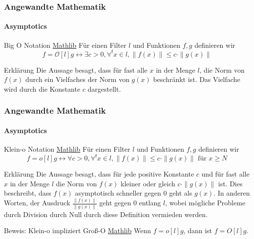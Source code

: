 \documentclass{beamer}
\begin{document}
\begin{frame}
    \frametitle{Angewandte Mathematik}
    \framesubtitle{Asymptotics}
    \begin{block}{Big O Notation \href{https://github.com/leanprover-community/mathlib4/blob/69d256b3c87085fec8063376dfb231ee1fd345d8/Mathlib/Analysis/Asymptotics/Asymptotics.lean\#L75-L80}{Mathlib}}
        Für einen Filter $l$ und Funktionen $f,g$ definieren wir 
        \[
       f = \mathcal{O}[l] g \leftrightarrow  \exists c > 0, \forall^\mathsf{f} x \in l, \|f(x)\| \leq c \cdot \|g(x)\|
        \]
    \end{block}

    \begin{block}{Erklärung}
        Die Aussage besagt, dass für fast alle \(x\) in der Menge \(l\), die Norm von \(f(x)\) durch ein Vielfaches der Norm von \(g(x)\) beschränkt ist. Das Vielfache wird durch die Konstante \(c\) dargestellt.
    \end{block}
    
\end{frame}

\begin{frame}
    \frametitle{Angewandte Mathematik}
    \framesubtitle{Asymptotics}

    \begin{block}{Klein-o Notation \href{https://github.com/leanprover-community/mathlib4/blob/69d256b3c87085fec8063376dfb231ee1fd345d8/Mathlib/Analysis/Asymptotics/Asymptotics.lean\#L161-L162}{Mathlib}}
        Für einen Filter $l$ und Funktionen $f,g$ definieren wir 
        \[
       f = o[l] g \leftrightarrow \forall c > 0,  \forall^\mathsf{f} x \in l, \|f(x)\| \leq c \cdot \|g(x)\| \text{ für } x \geq N
        \]
    \end{block}

    \begin{block}{Erklärung}
        Die Aussage besagt, dass für jede positive Konstante \(c\) und für fast alle \(x\) in der Menge \(l\)  die Norm von \(f(x)\) kleiner oder gleich \(c \cdot \|g(x)\|\) ist. Dies beschreibt, dass \(f(x)\) asymptotisch schneller gegen 0 geht als \(g(x)\).
        In anderen Worten, der Ausdruck         
        $\frac{\|f(x)\|}{\|g(x)\|}$
        geht gegen $0$ entlang $l$, wobei mögliche Probleme durch Division durch Null durch diese Definition vermieden werden.
    \end{block}
    
    \begin{block}{Beweis: Klein-o impliziert Groß-O \href{https://github.com/leanprover-community/mathlib4/blob/69d256b3c87085fec8063376dfb231ee1fd345d8/Mathlib/Analysis/Asymptotics/Asymptotics.lean\#L191-L192}{Mathlib}}
        Wenn \( f = o[l] g \), dann ist \( f = O[l] g \).
        \end{block}
    
\end{frame}
\end{document}
